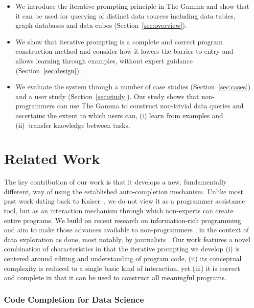 \documentclass[manuscript,review,anonymous]{acmart}
\begin{document}
\begin{itemize}
\item We introduce the iterative prompting principle in The Gamma
  and show that it can be used for querying of distinct data sources including data tables, graph
  databases and data cubes (Section~\ref{sec:overview}).


\item We show that iterative prompting is a complete and correct program construction method and
  consider how it lowers the barrier to entry and allows learning through examples, without
  expert guidance (Section~\ref{sec:design}).

\item We evaluate the system through a number of case studies (Section~\ref{sec:cases})
  and a user study (Section~\ref{sec:study}). Our study shows that non-programmers can use The Gamma
  to construct non-trivial data queries and ascertains the extent to which users can,
  (i) learn from examples and (ii)~transfer knowledge between tasks.
\end{itemize}


\section{Related Work}

The key contribution of our work is that it develops a new, fundamentally different, way of using the
established auto-completion mechanism. Unlike most past work dating back to Kaiser~\cite{assistants},
we do not view it as a programmer assistance tool, but as an interaction mechanism through which
non-experts can create entire programs. We build on recent research on information-rich
programming \cite{inforich} and aim to make those advances available to non-programmers
\cite{enduser,smallmatter}, in the context of data exploration as done, most notably, by
journalists \cite{ddj}. Our work features a novel combination of characteristics in that
the iterative prompting we develop (i) is centered around editing and understanding of program code,
(ii) its conceptual complexity is reduced to a single basic kind of interaction, yet (iii) it is
correct and complete in that it can be used to construct all meaningful programs.

\subsubsection*{Code Completion for Data Science}
\end{document}
